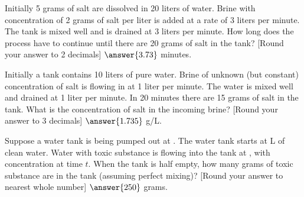 \documentclass{ximera}
\begin{document}
\begin{exercise}
    Initially 5 grams of salt are dissolved in 20 liters of water. Brine with concentration of 2 grams of salt per liter is added at a rate of 3 liters per minute.  The tank is mixed well and is drained at 3 liters per minute.  How long does the process have to continue until there are 20 grams of salt in the tank? [Round your answer to 2 decimals] $\answer{3.73}$ minutes.
\end{exercise}

\begin{exercise}
    Initially a tank contains 10 liters of pure water. Brine of unknown (but constant) concentration of salt is flowing in at 1 liter per minute. The water is mixed well and drained at 1 liter per minute. In 20 minutes there are 15 grams of salt in the tank.  What is the concentration of salt in the incoming brine? [Round your answer to 3 decimals] $\answer{1.735}$ g/L.
\end{exercise}

\begin{exercise}%
    Suppose a water tank is being pumped out at .  The water tank starts at \unit[10]{L} of clean water. Water with toxic substance is flowing into the tank at , with concentration  at time $t$. When the tank is half empty, how many grams of toxic substance are in the tank (assuming perfect mixing)? [Round your answer to nearest whole number] $\answer{250}$ grams.
\end{exercise}
\end{document}
